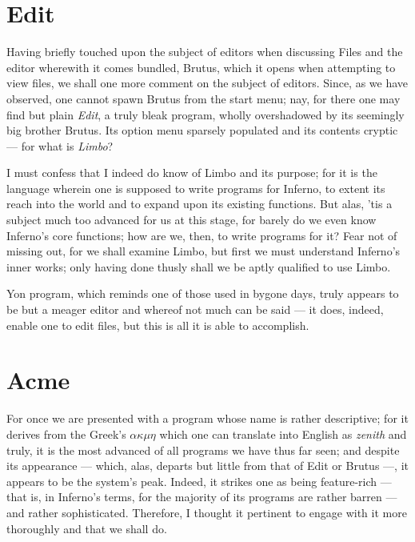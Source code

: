 \documentclass[a5paper,twoside,12pt]{report}
\begin{document}
    \section*{Edit}


    Having briefly touched upon the subject of editors when discussing Files and the editor wherewith it comes bundled, Brutus, which it opens when attempting to view files, we shall one more comment on the subject of editors. Since, as we have observed, one cannot spawn Brutus from the start menu; nay, for there one may find but plain \textit{Edit}, a truly bleak program, wholly overshadowed by its seemingly big brother Brutus. Its option menu sparsely populated and its contents cryptic — for what is \textit{Limbo}?

    I must confess that I indeed do know of Limbo and its purpose; for it is the language wherein one is supposed to write programs for Inferno, to extent its reach into the world and to expand upon its existing functions. But alas, 'tis a subject much too advanced for us at this stage, for barely do we even know Inferno's core functions; how are we, then, to write programs for it? Fear not of missing out, for we shall examine Limbo, but first we must understand Inferno's inner works; only having done thusly shall we be aptly qualified to use Limbo.

    Yon program, which reminds one of those used in bygone days, truly appears to be but a meager editor and whereof not much can be said — it does, indeed, enable one to edit files, but this is all it is able to accomplish.

    \section*{Acme}

    For once we are presented with a program whose name is rather descriptive; for it derives from the Greek's \textit{$\alpha$$\kappa$$\mu$$\eta$} which one can translate into English as \textit{zenith} and truly, it is the most advanced of all programs we have thus far seen; and despite its appearance — which, alas, departs but little from that of Edit or Brutus —, it appears to be the system's peak. Indeed, it strikes one as being feature-rich — that is, in Inferno's terms, for the majority of its programs are rather barren — and rather sophisticated. Therefore, I thought it pertinent to engage with it more thoroughly and that we shall do.
\end{document}
